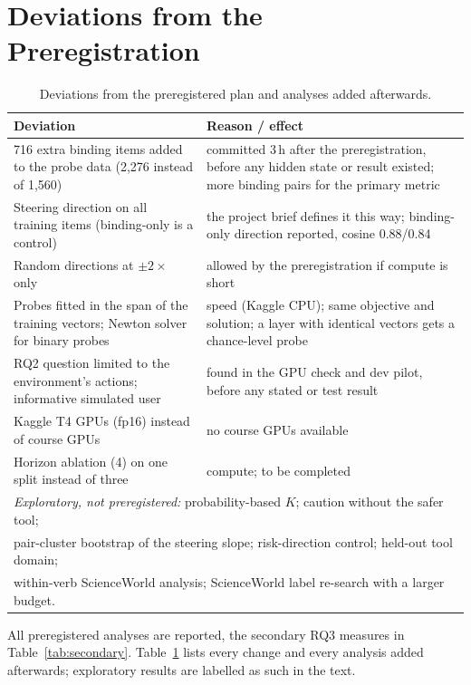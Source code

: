 \documentclass[11pt]{article}
\begin{document}
\section{Deviations from the Preregistration}
\label{sec:deviations}
\begin{table}[t]
\centering\small
\begin{tabular}{p{}p{}}
\toprule
Deviation & Reason / effect \\
\midrule
716 extra binding items added to the probe data (2{,}276 instead of 1{,}560) & committed 3\,h after the preregistration, before any hidden state or result existed; more binding pairs for the primary metric \\
Steering direction on all training items (binding-only is a control) & the project brief defines it this way; binding-only direction reported, cosine 0.88/0.84 \\
Random directions at $\pm2\times$ only & allowed by the preregistration if compute is short \\
Probes fitted in the span of the training vectors; Newton solver for binary probes & speed (Kaggle CPU); same objective and solution; a layer with identical vectors gets a chance-level probe \\
RQ2 question limited to the environment's actions; informative simulated user & found in the GPU check and dev pilot, before any stated or test result \\
Kaggle T4 GPUs (fp16) instead of course GPUs & no course GPUs available \\
Horizon ablation (4) on one split instead of three & compute; to be completed \\
\midrule
\multicolumn{2}{p{0.94\textwidth}}{\emph{Exploratory, not preregistered:} probability-based $K$; caution without the safer tool;} \\
\multicolumn{2}{p{0.94\textwidth}}{pair-cluster bootstrap of the steering slope; risk-direction control; held-out tool domain;} \\
\multicolumn{2}{p{0.94\textwidth}}{within-verb ScienceWorld analysis; ScienceWorld label re-search with a larger budget.} \\
\bottomrule
\end{tabular}
\caption{Deviations from the preregistered plan and analyses added afterwards.}
\label{tab:deviations}
\end{table}
All preregistered analyses are reported, the secondary RQ3 measures in Table~\ref{tab:secondary}. Table~\ref{tab:deviations} lists every change and every analysis added afterwards; exploratory results are labelled as such in the text.
\end{document}

